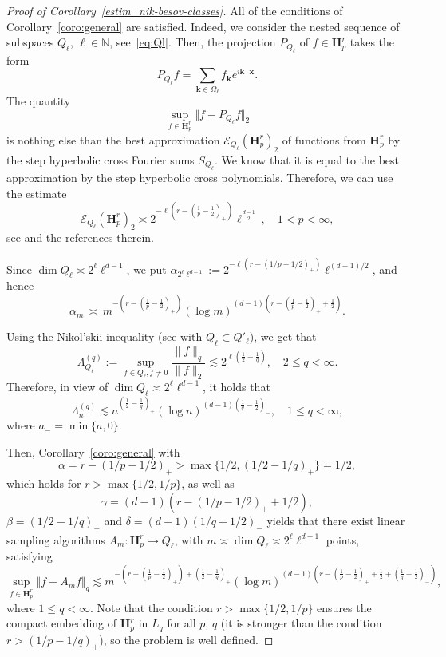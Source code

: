 \documentclass[a4paper,12pt]{amsart}
\theoremstyle{definition}
\theoremstyle{remark}
\newcommand{\bk}{\mathbf{k}}
\newcommand{\bx}{\mathbf{x}}
\begin{document}
\begin{proof}[Proof of Corollary~\ref{estim_nik-besov-classes}]
All of the conditions of Corollary~\ref{coro:general} are satisfied. Indeed, we consider the nested sequence of subspaces $Q_\ell$, $\ell \in \mathbb{N}$, 
see~\eqref{eq:Ql}. Then, the projection $P_{Q_\ell}$ of $f \in \mathbf{H}^r_p$ takes the form
$$
P_{Q_\ell} f = \sum_{\bk \in \Omega_\ell} f_\bk  e^{i \bk \cdot \bx}.
$$   
The quantity 
$$
\sup_{f \in \mathbf{H}^r_p} \Vert f - P_{Q_\ell} f  \Vert_2 
$$
is nothing else than the best approximation $\mathcal{E}_{Q_\ell} (\mathbf{H}^r_p)_2$ of functions from $\mathbf{H}^r_p$ by the step hyperbolic cross Fourier sums $S_{Q_\ell}$. We know that
{it is equal to} 
the best approximation  by the step hyperbolic cross polynomials. 
Therefore, we can use the estimate
$$
{\mathcal{E}_{Q_\ell} (\mathbf{H}^r_p)_2}
\asymp 2^{-\ell (r-(\frac{1}{p}-\frac{1}{2})_+)}  {\ell}^{\frac{d-1}{2}}\,, \quad 1<p<\infty,
$$
 see \cite[Thm. 4.2.6]{DTU18} and the references therein.
 
Since $\dim{Q_\ell}\asymp 2^\ell \ell^{d-1}$, we put  $\alpha_{2^\ell \ell^{d-1}} := 2^{-\ell (r-(1/p-1/2)_+)} \ell^{(d-1)/2}$, and hence
$$
\alpha_m \,\asymp\,
m^{- (r-(\frac{1}{p}-\frac{1}{2})_+)}
(\log m)^{(d-1)\left(r-(\frac{1}{p}-\frac{1}{2})_+ + \frac{1}{2}\right)}.
$$



Using the Nikol'skii inequality (see \cite[Thm.~2.4.9]{DTU18} with $Q_{\ell}\subset 
{Q'_\ell}$), we get that 
$$
{\Lambda^{(q)}_{Q_{\ell}}}:= 
\sup_{f\in Q_\ell, f \neq 0}\frac{\|f\|_q}{\|f\|_2} \lesssim 2^{\ell (\frac12-\frac1q)}, \quad 2\leq q < \infty.
$$
Therefore, in view of $\dim Q_\ell\asymp2^{\ell} \ell^{d-1}$, it 
 {holds that}
\begin{equation}\label{Chr_f_Lq_trigonom}
\Lambda^{(q)}_n \lesssim n^{(\frac12-\frac1q)_+} (\log n)^{(d-1)(\frac1q-\frac12)_-}, \quad 1\leq q < \infty,
\end{equation}
where $a_- = \min\{a, 0\}$.

Then, Corollary~\ref{coro:general} with
$$\alpha = r-(1/p-1/2)_+ 
> \max\{1/2, (1/2-1/q)_+ \}= 1/2, $$
which holds for 
$r>\max \{1/2, 1/p\}$, 
as well as 
$$\gamma =(d-1)(r-(1/p-1/2)_+ + 1/2), $$ 
$\beta = (1/2-1/q)_+$ and $\delta =(d-1)(1/q-1/2)_-$
yields that 
there exist linear sampling algorithms $A_{m} \colon \mathbf{H}^r_p \to Q_\ell$,
with	$m \asymp \dim Q_\ell \asymp 2^\ell \ell^{d-1}$ 
 {points,}
satisfying
$$
\sup_{f \in \mathbf{H}^r_p} \Vert f - A_{m} f  \Vert_q	 \lesssim 
m^{-(r-(\frac{1}{p}-\frac{1}{2})_+) + (\frac12-\frac{1}{q})_+}
(\log m)^{(d-1)\left(r-(\frac{1}{p}-\frac{1}{2})_+ + \frac{1}{2} + (\frac{1}{q}-\frac{1}{2})_-\right)},
$$
where 
$1\leq q < \infty$.
 {Note that}
the condition $r>\max \{1/2, 1/p\}$ ensures the compact embedding of $\mathbf{H}^r_p$ in $L_q$ for all $p$, $q$ {(it is stronger than the condition $r>(1/p-1/q)_+$)}, so the problem is well defined.



\end{proof}
\end{document}
